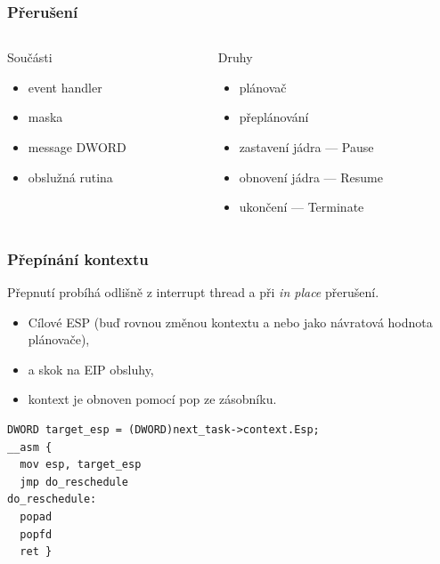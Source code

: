 \documentclass{beamer}
\begin{document}
\begin{frame}
\frametitle{Přerušení}

\begin{columns}
  \begin{column}{0.5\textwidth}
\begin{block}{Součásti}
\begin{itemize}
  \item event handler
  \item maska
  \item message DWORD
  \item obslužná rutina
\end{itemize}
\end{block}
  \end{column}

  \begin{column}{0.5\textwidth}
\begin{block}{Druhy}
\begin{itemize}
  \item plánovač
  \item přeplánování
  \item zastavení jádra --- Pause
  \item obnovení jádra --- Resume
  \item ukončení --- Terminate
\end{itemize}
\end{block}
  \end{column}
\end{columns}

\end{frame}

\begin{frame}[fragile]
\frametitle{Přepínání kontextu}

Přepnutí probíhá odlišně z interrupt thread a při \emph{in place} přerušení.
\begin{itemize}
\item Cílové ESP (buď rovnou změnou kontextu a nebo jako návratová hodnota plánovače),
\item a skok na EIP obsluhy,
\item kontext je obnoven pomocí pop ze zásobníku.
\end{itemize}

\begin{verbatim}
DWORD target_esp = (DWORD)next_task->context.Esp;
__asm {
  mov esp, target_esp
  jmp do_reschedule
do_reschedule:
  popad
  popfd
  ret }
\end{verbatim}
\end{frame}
\end{document}
